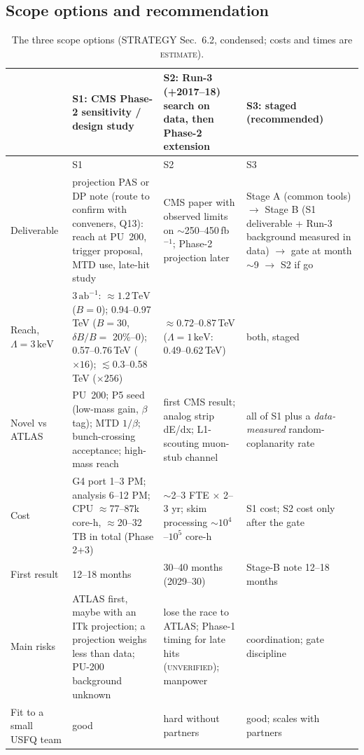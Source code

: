 \documentclass[11pt,a4paper]{article}
\newcommand{\EST}{\textsc{estimate}}
\newcommand{\UNV}{\textsc{unverified}}
\newcommand{\TeV}{\,\mathrm{TeV}}
\newcommand{\keV}{\,\mathrm{keV}}
\newcommand{\abinv}{\,\mathrm{ab}^{-1}}
\begin{document}
\subsection{Scope options and recommendation}
{\small
\begin{longtable}{@{}L{2.45cm}L{4.59cm}L{4.59cm}L{4.49cm}@{}}
\caption{The three scope options (STRATEGY Sec.~6.2, condensed; costs and times are \EST).}\label{tab:scope}\\
\toprule & \textbf{S1: CMS Phase-2 sensitivity / design study} & \textbf{S2: Run-3 (+2017--18) search on data, then Phase-2 extension} & \textbf{S3: staged (recommended)}\\\midrule\endfirsthead
\toprule & S1 & S2 & S3\\\midrule\endhead
\bottomrule\endfoot
Deliverable & projection PAS or DP note (route to confirm with conveners, Q13): reach at PU~200, trigger proposal, MTD use, late-hit study & CMS paper with observed limits on $\sim$250--450\,fb$^{-1}$; Phase-2 projection later & Stage A (common tools) $\to$ Stage B (S1 deliverable + Run-3 background measured in data) $\to$ gate at month $\sim$9 $\to$ S2 if go\\
Reach, $\Lambda=3\keV$ & $3\abinv$: $\approx1.2\TeV$ ($B=0$); 0.94--0.97\,TeV ($B=30$, $\delta B/B=$ 20\%--0); 0.57--0.76\,TeV ($\times16$); $\lesssim$0.3--0.58\,TeV ($\times256$) & $\approx0.72$--0.87\,TeV ($\Lambda=1\keV$: 0.49--0.62\,TeV) & both, staged\\
Novel vs ATLAS & PU~200; P5 seed (low-mass gain, $\beta$ tag); MTD $1/\beta$; bunch-crossing acceptance; high-mass reach & first CMS result; analog strip dE/dx; L1-scouting muon-stub channel & all of S1 plus a \emph{data-measured} random-coplanarity rate\\
Cost & G4 port 1--3 PM; analysis 6--12 PM; CPU $\approx$77--87k core-h, $\approx$20--32\,TB in total (Phase 2+3) & $\sim$2--3 FTE $\times$ 2--3 yr; skim processing $\sim10^4$--$10^5$ core-h & S1 cost; S2 cost only after the gate\\
First result & 12--18 months & 30--40 months (2029--30) & Stage-B note 12--18 months\\
Main risks & ATLAS first, maybe with an ITk projection; a projection weighs less than data; PU-200 background unknown & lose the race to ATLAS; Phase-1 timing for late hits (\UNV); manpower & coordination; gate discipline\\
Fit to a small USFQ team & good & hard without partners & good; scales with partners\\
\end{longtable}
}
\end{document}
